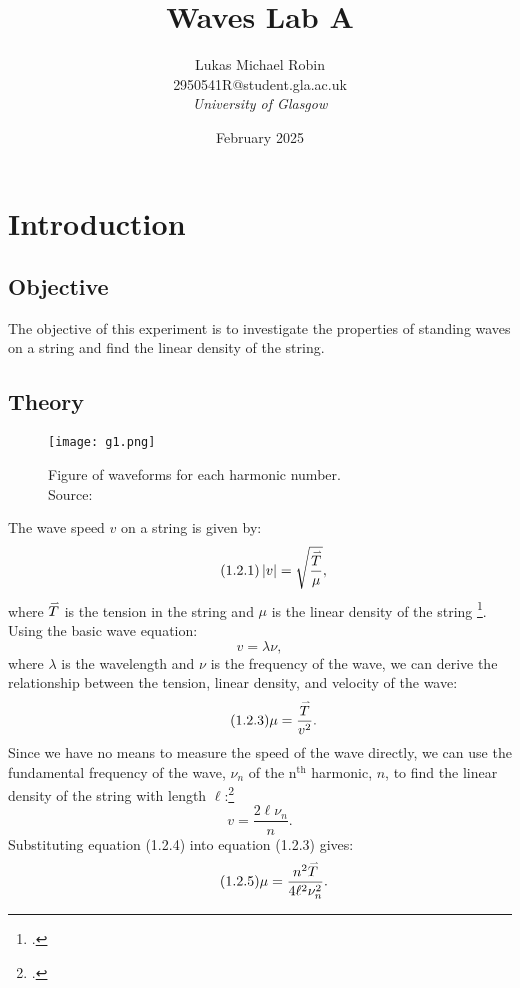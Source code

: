 \documentclass[12pt, a4paper, english]{article}
\title{Waves Lab A}
\author{Lukas Michael Robin \orcidlink{0000-0003-3146-5903} \\
2950541R@student.gla.ac.uk \\
\textit{University of Glasgow}}
\date{February 2025}
\newcommand{\vc}[1]{\accentset{\rightharpoonup}{#1}}
\begin{document}
\maketitle

\begin{abstract}
\end{abstract}

\pagebreak
\tableofcontents
\pagebreak

\section{Introduction}
\subsection{Objective}
The objective of this experiment is to investigate the properties of standing waves on a string and find the linear density of the string.

\subsection{Theory}

\begin{figure}[H]
    \centering
    \texttt{[image: g1.png]}
    \caption{Figure of waveforms for each harmonic number. \\ Source: \cite{article1}}
    \label{fig:string}
\end{figure}

The wave speed \( v \) on a string is given by:
\begin{equation}\tag{1.2.1}
    \left\lvert v \right\rvert = \sqrt{\frac{\vc{T}}{\mu}},
\end{equation}
where \( \vc{T} \) is the tension in the string and \( \mu \) is the linear density of the string \footcite{osphysics}.
Using the basic wave equation: 
\begin{equation}\tag{1.2.2}
    v = \lambda \nu,
\end{equation}
where \( \lambda \) is the wavelength and \( \nu \) is the frequency of the wave, we can derive the relationship between the tension, linear density, and velocity of the wave:
\begin{equation}\tag{1.2.3}
    \mu = \frac{\vc{T}}{v^2}.
\end{equation}
Since we have no means to measure the speed of the wave directly, we can use the fundamental frequency of the wave, $\nu_n$ of the $\text{n}^\text{th}$ harmonic, $n$, to find the linear density of the string with length $\ell$:\footcite{YF}
\begin{equation}\tag{1.2.4}
    v= \frac{2\ell\nu_n}{n}.
\end{equation}
Substituting equation (1.2.4) into equation (1.2.3) gives:
\begin{equation}\tag{1.2.5}
    \mu = \frac{n^2\vc{T}}{4\ell^2\nu_n^2}.
\end{equation}
\end{document}
